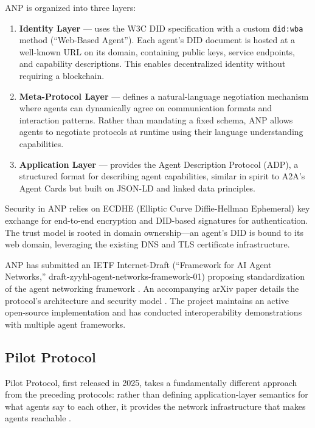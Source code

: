 \documentclass[11pt,a4paper]{article}
\begin{document}
ANP is organized into three layers:

\begin{enumerate}
    \item \textbf{Identity Layer} --- uses the W3C DID specification with a custom \texttt{did:wba} method (``Web-Based Agent''). Each agent's DID document is hosted at a well-known URL on its domain, containing public keys, service endpoints, and capability descriptions. This enables decentralized identity without requiring a blockchain.
    \item \textbf{Meta-Protocol Layer} --- defines a natural-language negotiation mechanism where agents can dynamically agree on communication formats and interaction patterns. Rather than mandating a fixed schema, ANP allows agents to negotiate protocols at runtime using their language understanding capabilities.
    \item \textbf{Application Layer} --- provides the Agent Description Protocol (ADP), a structured format for describing agent capabilities, similar in spirit to A2A's Agent Cards but built on JSON-LD and linked data principles.
\end{enumerate}

Security in ANP relies on ECDHE (Elliptic Curve Diffie-Hellman Ephemeral) key exchange for end-to-end encryption and DID-based signatures for authentication. The trust model is rooted in domain ownership---an agent's DID is bound to its web domain, leveraging the existing DNS and TLS certificate infrastructure.

ANP has submitted an IETF Internet-Draft (``Framework for AI Agent Networks,'' draft-zyyhl-agent-networks-framework-01) proposing standardization of the agent networking framework \cite{anp-ietf}. An accompanying arXiv paper details the protocol's architecture and security model \cite{anp-paper}. The project maintains an active open-source implementation and has conducted interoperability demonstrations with multiple agent frameworks.

\subsection{Pilot Protocol}

Pilot Protocol, first released in 2025, takes a fundamentally different approach from the preceding protocols: rather than defining application-layer semantics for what agents say to each other, it provides the network infrastructure that makes agents reachable \cite{pilot-whitepaper}.
\end{document}
